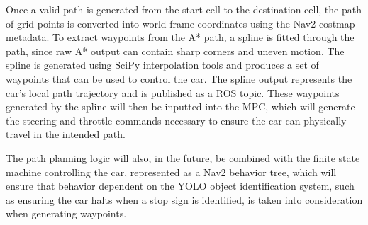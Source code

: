Once a valid path is generated from the start cell to the destination cell, the path of grid points is converted into world frame coordinates using the Nav2 costmap metadata. To extract waypoints from the A* path, a spline is fitted through the path, since raw A* output can contain sharp corners and uneven motion. The spline is generated using SciPy interpolation tools and produces a set of waypoints that can be used to control the car. The spline output represents the car’s local path trajectory and is published as a ROS topic. These waypoints generated by the spline will then be inputted into the MPC, which will generate the steering and throttle commands necessary to ensure the car can physically travel in the intended path.

The path planning logic will also, in the future, be combined with the finite state machine controlling the car, represented as a Nav2 behavior tree, which will ensure that behavior dependent on the YOLO object identification system, such as ensuring the car halts when a stop sign is identified, is taken into consideration when generating waypoints.
